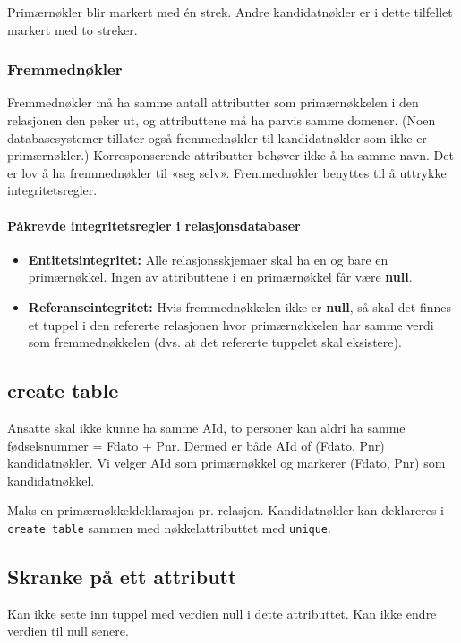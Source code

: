 \documentclass[11pt,a4paper]{article}
\begin{document}
Primærnøkler blir markert med én strek. Andre kandidatnøkler er i dette tilfellet markert med to streker. 

\subsubsection{Fremmednøkler}
Fremmednøkler må ha samme antall attributter som primærnøkkelen i den relasjonen den peker ut, og attributtene må ha parvis samme domener. (Noen databasesystemer tillater også fremmednøkler til kandidatnøkler som ikke er primærnøkler.)
Korresponserende attributter behøver ikke å ha samme navn. Det er lov å ha fremmednøkler til «seg selv». Fremmednøkler benyttes til å uttrykke integritetsregler.

\paragraph{Påkrevde integritetsregler i relasjonsdatabaser}
\begin{itemize}
\item{\textbf{Entitetsintegritet:} Alle relasjonsskjemaer skal ha en og bare en primærnøkkel. Ingen av attributtene i en primærnøkkel får være \textbf{null}.}
\item{\textbf{Referanseintegritet:} Hvis fremmednøkkelen ikke er \textbf{null}, så skal det finnes et tuppel i den refererte relasjonen hvor primærnøkkelen har samme verdi som fremmednøkkelen (dvs. at det refererte tuppelet skal eksistere).}
\end{itemize}

\subsection{create table}


Ansatte skal ikke kunne ha samme AId, to personer kan aldri ha samme fødselsnummer = Fdato + Pnr. Dermed er både AId of (Fdato, Pnr) kandidatnøkler. Vi velger AId som primærnøkkel og markerer (Fdato, Pnr) som kandidatnøkkel.

Maks en primærnøkkeldeklarasjon pr. relasjon. Kandidatnøkler kan deklareres i \texttt{create table} sammen med nøkkelattributtet med \texttt{unique}.

\subsection{Skranke på ett attributt}

Kan ikke sette inn tuppel med verdien null i dette attributtet. Kan ikke endre verdien til null senere.
\end{document}
